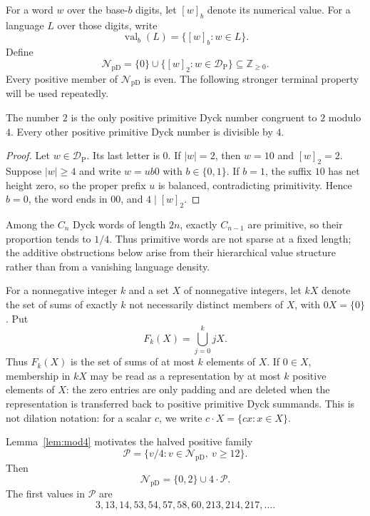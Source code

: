 \documentclass{ws-ijfcs}
\newcommand{\val}[2]{[#1]_{#2}}
\newcommand{\NpD}{\mathcal{N}_{\mathrm{pD}}}
\newcommand{\DP}{\mathcal{D}_{\mathrm{P}}}
\newcommand{\Pset}{\mathcal P}
\begin{document}
For a word $w$ over the base-$b$ digits, let $\val{w}{b}$ denote its
numerical value.  For a language $L$ over those digits, write
\[
 \operatorname{val}_b(L)=\{\val{w}{b}:w\in L\}.
\]
Define
\[
 \NpD=\{0\}\cup\{\val{w}{2}:w\in\DP\}
 \subseteq\mathbb Z_{\geq0}.
\]
Every positive member of $\NpD$ is even.  The following stronger terminal
property will be used repeatedly.

\begin{lemma}\label{lem:mod4}
The number $2$ is the only positive primitive Dyck number congruent to
$2$ modulo $4$.  Every other positive primitive Dyck number is divisible
by $4$.
\end{lemma}

\begin{proof}
Let $w\in\DP$.  Its last letter is $0$.  If $|w|=2$, then $w=10$ and
$[w]_2=2$.  Suppose $|w|\geq4$ and write $w=ub0$ with $b\in\{0,1\}$.
If $b=1$, the suffix $10$ has net height zero, so the proper prefix $u$
is balanced, contradicting primitivity.  Hence $b=0$, the word ends in
$00$, and $4\mid[w]_2$.
\end{proof}

Among the $C_n$ Dyck words of length $2n$, exactly $C_{n-1}$ are
primitive, so their proportion tends to $1/4$.  Thus primitive words are
not sparse at a fixed length; the additive obstructions below arise from
their hierarchical value structure rather than from a vanishing language
density.

For a nonnegative integer $k$ and a set $X$ of nonnegative integers, let
$kX$ denote the set of sums of exactly $k$ not necessarily distinct
members of $X$, with $0X=\{0\}$.  Put
\[
 F_k(X)=\bigcup_{j=0}^{k}jX.
\]
Thus $F_k(X)$ is the set of sums of at most $k$ elements of $X$.  If
$0\in X$, membership in $kX$ may be read as a representation by at most
$k$ positive elements of $X$: the zero entries are only padding and are
deleted when the representation is transferred back to positive primitive
Dyck summands.  This is not dilation notation: for a scalar $c$, we write
$c\cdot X=\{cx:x\in X\}$.

Lemma~\ref{lem:mod4} motivates the halved positive family
\begin{equation}\label{eq:P-def}
 \Pset=\{v/4:v\in\NpD,\ v\geq12\}.
\end{equation}
Then
\begin{equation}\label{eq:NpD-decomp}
 \NpD=\{0,2\}\cup4\cdot\Pset.
\end{equation}
The first values in $\Pset$ are
\[
 3,13,14,53,54,57,58,60,213,214,217,\ldots.
\]
\end{document}
